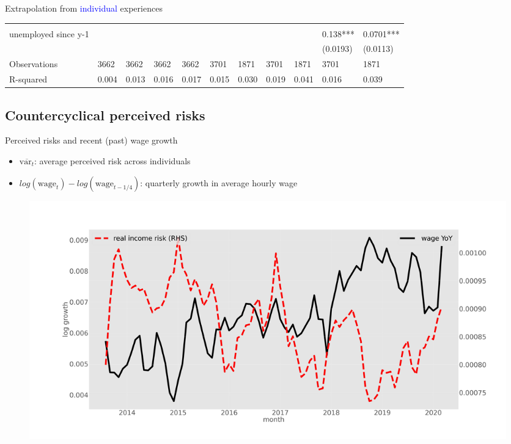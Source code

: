 \documentclass{beamer}
\begin{document}
\begin{frame}{Extrapolation from \textcolor{blue}{individual} experiences}
\begin{table}
{\begin{tabular}{lllllllllll}
				&           &           &           &           &            &            &            &            &            &            \\
				unemployed since y-1&           &           &           &           &            &            &            &            & 0.138***   & 0.0701***  \\
				&           &           &           &           &            &            &            &            & (0.0193)   & (0.0113)   \\
				Observations                          & 3662      & 3662      & 3662      & 3662      & 3701       & 1871       & 3701       & 1871       & 3701       & 1871       \\
				R-squared                             & 0.004     & 0.013     & 0.016     & 0.017     & 0.015      & 0.030      & 0.019      & 0.041      & 0.016      & 0.039      \\
				\hline 
			\end{tabular}
		}
	\end{table}
\end{frame}


\subsection{Countercyclical perceived risks}


\begin{frame}{Perceived risks and recent (past) wage growth}
\label{tsMean3mvrvar_he}
	\begin{itemize}
		\item $\overline{\text{var}_{t}} $: average perceived risk across individuals
		\item  $log(\text{wage}_t) - log(\text{wage}_{t-1/4})$: quarterly growth in average hourly wage
	\end{itemize}
	\begin{figure}
		\centering
		\label{ts_var}
		\includegraphics[width=\textwidth]{figures/tsMean3mvrvar_he.jpg}
	\end{figure}
	\quad  \hyperlink{appendix:tsMean3mvrexp_he}{} 
\end{frame}
\end{document}
